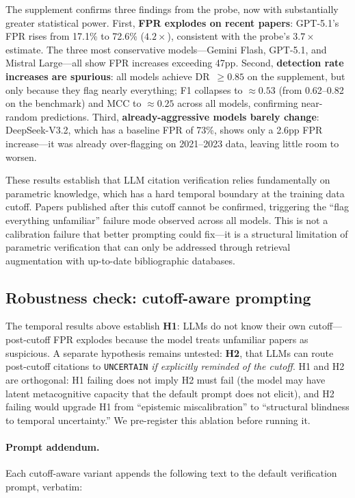 \medskip
The supplement confirms three findings from the probe, now with substantially greater statistical power.
First, \textbf{FPR explodes on recent papers}: GPT-5.1's FPR rises from 17.1\% to 72.6\% ($4.2{\times}$), consistent with the probe's $3.7{\times}$ estimate.
The three most conservative models---Gemini Flash, GPT-5.1, and Mistral Large---all show FPR increases exceeding 47pp.
Second, \textbf{detection rate increases are spurious}: all models achieve DR~${\geq}0.85$ on the supplement, but only because they flag nearly everything; F1 collapses to ${\approx}0.53$ (from 0.62--0.82 on the benchmark) and MCC to ${\approx}0.25$ across all models, confirming near-random predictions.
Third, \textbf{already-aggressive models barely change}: DeepSeek-V3.2, which has a baseline FPR of 73\%, shows only a 2.6pp FPR increase---it was already over-flagging on 2021--2023 data, leaving little room to worsen.

These results establish that LLM citation verification relies fundamentally on parametric knowledge, which has a hard temporal boundary at the training data cutoff.
Papers published after this cutoff cannot be confirmed, triggering the ``flag everything unfamiliar'' failure mode observed across all models.
This is not a calibration failure that better prompting could fix---it is a structural limitation of parametric verification that can only be addressed through retrieval augmentation with up-to-date bibliographic databases.

\subsection*{Robustness check: cutoff-aware prompting}
\label{app:cutoff-aware}

The temporal results above establish \textbf{H1}: LLMs do not know their own cutoff---post-cutoff FPR explodes because the model treats unfamiliar papers as suspicious.
A separate hypothesis remains untested: \textbf{H2}, that LLMs can route post-cutoff citations to \texttt{UNCERTAIN} \emph{if explicitly reminded of the cutoff}.
H1 and H2 are orthogonal: H1 failing does not imply H2 must fail (the model may have latent metacognitive capacity that the default prompt does not elicit), and H2 failing would upgrade H1 from ``epistemic miscalibration'' to ``structural blindness to temporal uncertainty.''
We pre-register this ablation before running it.

\paragraph{Prompt addendum.}
Each cutoff-aware variant appends the following text to the default verification prompt, verbatim:

